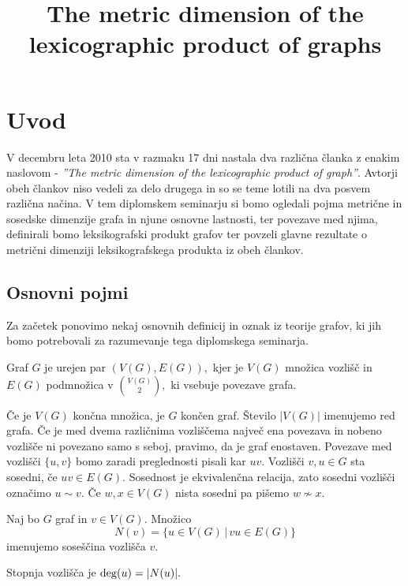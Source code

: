 \documentclass[mat1, tisk]{fmfdelo}
\title{The metric dimension of the lexicographic product of graphs}
\newcommand{\1}{(1, 1, \ldots, 1)}
\newcommand{\2}{(2, 2, \ldots, 2)}
\begin{document}
\section{Uvod}
V decembru leta 2010 sta v razmaku 17 dni nastala dva različna članka z enakim naslovom - 
\textit{''The metric dimension of the lexicographic product of graph''}. Avtorji obeh člankov 
niso vedeli za delo drugega in so se teme lotili na dva posvem različna načina. V tem diplomskem 
seminarju si bomo ogledali pojma metrične in sosedske dimenzije grafa in njune osnovne lastnosti, 
ter povezave med njima, definirali bomo leksikografski produkt grafov ter povzeli 
glavne rezultate o metrični dimenziji leksikografskega produkta iz obeh člankov.




\subsection{Osnovni pojmi} \label{ss:osnovni_pojmi}
Za začetek ponovimo nekaj osnovnih definicij in oznak iz teorije grafov, ki jih bomo potrebovali 
za razumevanje tega diplomskega seminarja. 

\begin{definicija} \label{def:graf}
    Graf $G$ je urejen par $(V(G), E(G)),$ kjer je $V(G)$ množica vozlišč in $E(G)$ 
    podmnožica v $\binom{V(G)}{2},$ ki vsebuje povezave grafa.
\end{definicija}

Če je $V(G)$ končna množica, je $G$ končen graf. Število $|V(G)|$ imenujemo red grafa. 
Če je med dvema različnima vozliščema največ ena povezava in nobeno vozlišče ni povezano samo 
s seboj, pravimo, da je graf enostaven. Povezave med vozlišči $\{u, v\}$ bomo zaradi preglednosti
pisali kar $uv$. Vozlišči $v, u \in G$ sta sosedni, če $uv \in E(G).$ 
Sosednost je ekvivalenčna relacija, zato sosedni vozlišči označimo $u \sim v.$ Če $w, x \in V(G)$ 
nista sosedni pa pišemo $w \not \sim x.$

\begin{definicija} \label{def:sosescina}
    Naj bo $G$ graf in $v \in V(G)$. Množico 
    $$N(v) = \{u \in V(G) \, | \,vu \in E(G) \}$$ imenujemo soseščina vozlišča $v$.

    Stopnja vozlišča je ${\rm deg}(u) = |N(u)|.$
\end{definicija}
\end{document}
